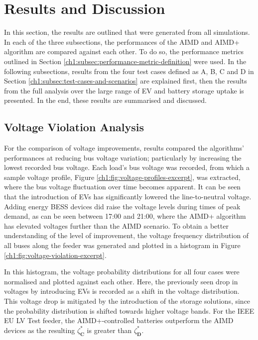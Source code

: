 \section{Results and Discussion}
\label{ch1:sec:results-and-discussion}

In this section, the results are outlined that were generated from all simulations. In each of the three subsections, the performances of the AIMD and AIMD+ algorithm are compared against each other. To do so, the performance metrics outlined in Section \ref{ch1:subsec:performance-metric-definition} were used. In the following subsections, results from the four test cases defined as {A}, {B}, {C} and {D} in Section \ref{ch1:subsec:test-cases-and-scenarios} are explained first, then the results from the full analysis over the large range of EV and battery storage uptake is presented. In the end, these results are summarised and discussed.

\subsection{Voltage Violation Analysis}

For the comparison of voltage improvements, results compared the algorithms' performances at reducing bus voltage variation; particularly by increasing the lowest recorded bus voltage. Each load's bus voltage was recorded, from which a sample voltage profile, Figure \ref{ch1:fig:voltage-profiles-excerpt}, was extracted, where the bus voltage fluctuation over time becomes apparent. It can be seen that the introduction of EVs has significantly lowered the line-to-neutral voltage. Adding energy BESS devices did raise the voltage levels during times of peak demand, as can be seen between 17:00 and 21:00, where the AIMD+ algorithm has elevated voltages further than the AIMD scenario. To obtain a better understanding of the level of improvement, the voltage frequency distribution of all buses along the feeder was generated and plotted in a histogram in Figure \ref{ch1:fig:voltage-violation-excerpt}.



In this histogram, the voltage probability distributions for all four cases were normalised and plotted against each other. Here, the previously seen drop in voltages by introducing EVs is recorded as a shift in the voltage distribution. This voltage drop is mitigated by the introduction of the storage solutions, since the probability distribution is shifted towards higher voltage bands. For the IEEE EU LV Test feeder, the AIMD+-controlled batteries outperform the AIMD devices as the resulting $\zeta_\textbf{C}^{*}$ is greater than $\zeta_\textbf{D}^{*}$.

